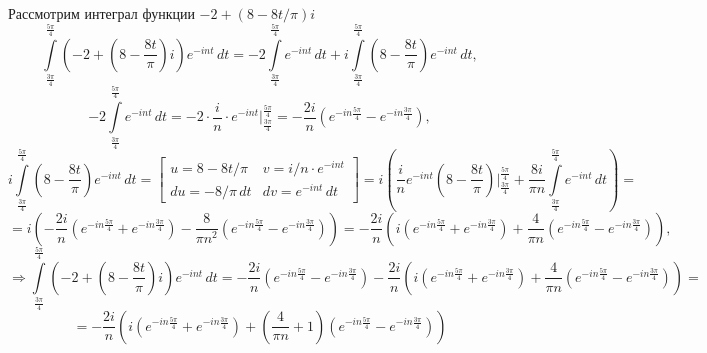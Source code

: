 \documentclass[a4paper, 16pt]{article}
\begin{document}
\noindent Рассмотрим интеграл функции $-2+\left(8-8t/\pi\right)i$
$$
\int\limits_{\frac{3\pi}{4}}^{\frac{5\pi}{4}}\left(-2+\left(8-\dfrac{8t}{\pi}\right)i\right)e^{-int}\,dt=
-2\int\limits_{\frac{3\pi}{4}}^{\frac{5\pi}{4}}e^{-int}\,dt+i\int\limits_{\frac{3\pi}{4}}^{\frac{5\pi}{4}}\left(8-\dfrac{8t}{\pi}\right)e^{-int}\,dt,
$$
$$
-2\int\limits_{\frac{3\pi}{4}}^{\frac{5\pi}{4}}e^{-int}\,dt=-2\cdot\dfrac{i}{n}\cdot e^{-int}\bigg|_{\frac{3\pi}{4}}^{\frac{5\pi}{4}}=-\dfrac{2i}{n}\left(e^{-in\frac{5\pi}{4}}-e^{-in\frac{3\pi}{4}}\right),
$$
$$
i\int\limits_{\frac{3\pi}{4}}^{\frac{5\pi}{4}}\left(8-\dfrac{8t}{\pi}\right)e^{-int}\,dt=
\begin{bmatrix}
    u=8-8t/\pi & v=i/n\cdot e^{-int} \\
    du=-8/\pi\,dt & dv=e^{-int}\,dt
\end{bmatrix}=
i\left(\dfrac{i}{n}e^{-int}\left(8-\dfrac{8t}{\pi}\right)\bigg|_{\frac{3\pi}{4}}^{\frac{5\pi}{4}}+\dfrac{8i}{\pi n}\int\limits_{\frac{3\pi}{4}}^{\frac{5\pi}{4}}e^{-int}\,dt\right)=
$$
$$
=i\left(-\dfrac{2i}{n}\left(e^{-in\frac{5\pi}{4}}+e^{-in\frac{3\pi}{4}}\right)-\dfrac{8}{\pi n^2}\left(e^{-in\frac{5\pi}{4}}-e^{-in\frac{3\pi}{4}}\right)\right)=
-\dfrac{2i}{n}\left(i\left(e^{-in\frac{5\pi}{4}}+e^{-in\frac{3\pi}{4}}\right)+\dfrac{4}{\pi n}\left(e^{-in\frac{5\pi}{4}}-e^{-in\frac{3\pi}{4}}\right)\right),
$$
$$
\Rightarrow\int\limits_{\frac{3\pi}{4}}^{\frac{5\pi}{4}}\left(-2+\left(8-\dfrac{8t}{\pi}\right)i\right)e^{-int}\,dt=
-\dfrac{2i}{n}\left(e^{-in\frac{5\pi}{4}}-e^{-in\frac{3\pi}{4}}\right)-\dfrac{2i}{n}\left(i\left(e^{-in\frac{5\pi}{4}}+e^{-in\frac{3\pi}{4}}\right)+\dfrac{4}{\pi n}\left(e^{-in\frac{5\pi}{4}}-e^{-in\frac{3\pi}{4}}\right)\right)=
$$
$$
=-\dfrac{2i}{n}\left(i\left(e^{-in\frac{5\pi}{4}}+e^{-in\frac{3\pi}{4}}\right)+\left(\dfrac{4}{\pi n}+1\right)\left(e^{-in\frac{5\pi}{4}}-e^{-in\frac{3\pi}{4}}\right)\right)
$$
\end{document}
